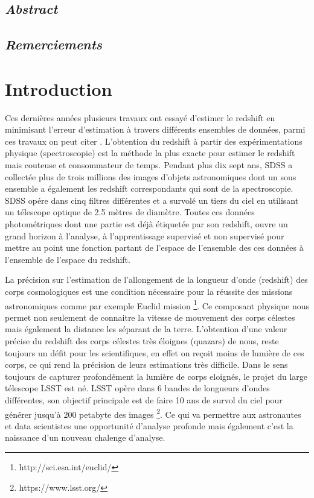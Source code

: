 \documentclass[french]{report}
\begin{document}
\section*{\textit{Abstract}}

\section*{\textit{Remerciements}}

\tableofcontents
\listoffigures
\listoftables

\thispagestyle{empty}
\setcounter{page}{0}

\chapter*{Introduction}
Ces dernières années plusieurs travaux ont essayé d'estimer le redshift en minimisant l'erreur d'estimation à travers différents ensembles de données, parmi ces travaux on peut citer \cite{photoredSDSS, stack, meuphirim, isanto}. L'obtention du redshift à partir des expérimentations physique (spectroscopie) est la méthode la plus exacte pour estimer le redshift mais couteuse et consommateur de temps. Pendant plus dix sept ans, SDSS \cite{sdss} a collectée plus de trois millions des images d'objets astronomiques dont un sous ensemble a également les redshift correspondants qui sont de la spectroscopie. SDSS opére dans cinq filtres différentes et a survolé un tiers du ciel en utilisant un télescope optique de 2.5 mètres de diamètre. Toutes ces données photométriques dont une partie est déjà étiquetée par son redshift, ouvre un grand horizon à l'analyse, à l'apprentissage supervisé et non supervisé pour mettre au point une fonction partant de l'espace de l'ensemble des ces données à l'ensemble de l'espace du redshift.  


La précision sur l'estimation de l'allongement de la longueur d'onde (redshift) des corps cosmologiques est une condition nécessaire pour la réussite des missions astronomiques comme par exemple Euclid mission \footnote{http://sci.esa.int/euclid/}. Ce composant physique nous permet non seulement de connaitre la vitesse de mouvement des corps célestes mais également la distance les séparant de la terre. L'obtention d'une valeur précise du redshift des corps célestes très éloignes (quazars) de nous, reste toujours un défit pour les scientifiques, en effet on reçoit moins de lumière de ces corps, ce qui rend la précision de leurs estimations très difficile. Dans le sens toujours de capturer profondément la lumière de corps eloignés, le projet du large télescope LSST est né. LSST opère dans 6 bandes de longueurs d'ondes différentes, son objectif principale est de faire 10 ans de survol du ciel pour générer jusqu'à 200 petabyte des images \footnote{https://www.lsst.org/}. Ce qui va permettre aux astronautes et data scientistes une opportunité d'analyse profonde mais également c'est la naissance d'un nouveau chalenge d'analyse.  
\end{document}

